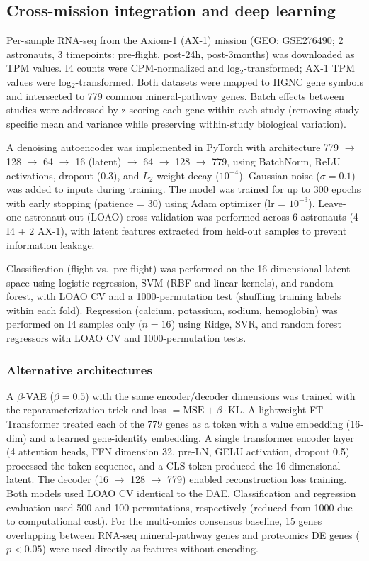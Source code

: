 \documentclass[11pt,a4paper]{article}
\begin{document}
\subsection{Cross-mission integration and deep learning}

Per-sample RNA-seq from the Axiom-1 (AX-1) mission (GEO: GSE276490; 2 astronauts, 3 timepoints: pre-flight, post-24h, post-3months) was downloaded as TPM values. I4 counts were CPM-normalized and log$_2$-transformed; AX-1 TPM values were log$_2$-transformed. Both datasets were mapped to HGNC gene symbols and intersected to 779 common mineral-pathway genes. Batch effects between studies were addressed by z-scoring each gene within each study (removing study-specific mean and variance while preserving within-study biological variation).

A denoising autoencoder was implemented in PyTorch with architecture 779 $\to$ 128 $\to$ 64 $\to$ 16 (latent) $\to$ 64 $\to$ 128 $\to$ 779, using BatchNorm, ReLU activations, dropout (0.3), and $L_2$ weight decay ($10^{-4}$). Gaussian noise ($\sigma = 0.1$) was added to inputs during training. The model was trained for up to 300 epochs with early stopping (patience = 30) using Adam optimizer (lr = $10^{-3}$). Leave-one-astronaut-out (LOAO) cross-validation was performed across 6 astronauts (4 I4 + 2 AX-1), with latent features extracted from held-out samples to prevent information leakage.

Classification (flight vs.\ pre-flight) was performed on the 16-dimensional latent space using logistic regression, SVM (RBF and linear kernels), and random forest, with LOAO CV and a 1000-permutation test (shuffling training labels within each fold). Regression (calcium, potassium, sodium, hemoglobin) was performed on I4 samples only ($n = 16$) using Ridge, SVR, and random forest regressors with LOAO CV and 1000-permutation tests.

\subsubsection{Alternative architectures}

A $\beta$-VAE ($\beta = 0.5$) with the same encoder/decoder dimensions was trained with the reparameterization trick and loss $= \text{MSE} + \beta \cdot \text{KL}$. A lightweight FT-Transformer treated each of the 779 genes as a token with a value embedding (16-dim) and a learned gene-identity embedding. A single transformer encoder layer (4 attention heads, FFN dimension 32, pre-LN, GELU activation, dropout 0.5) processed the token sequence, and a CLS token produced the 16-dimensional latent. The decoder (16 $\to$ 128 $\to$ 779) enabled reconstruction loss training. Both models used LOAO CV identical to the DAE. Classification and regression evaluation used 500 and 100 permutations, respectively (reduced from 1000 due to computational cost). For the multi-omics consensus baseline, 15 genes overlapping between RNA-seq mineral-pathway genes and proteomics DE genes ($p < 0.05$) were used directly as features without encoding.
\end{document}
